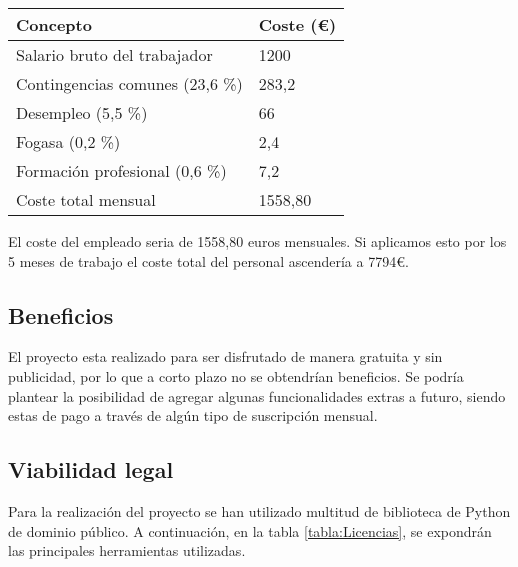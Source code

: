 \begin{table}[H]
	\begin{center}
		\begin{tabular}{ll}
			\hline
			Concepto                        & Coste (€) \\ \hline
			Salario bruto del trabajador    & 1200      \\
			Contingencias comunes (23,6 \%) & 283,2     \\
			Desempleo (5,5 \%)              & 66        \\
			Fogasa (0,2 \%)                 & 2,4       \\
			Formación profesional (0,6 \%)  & 7,2       \\ \hline
			Coste total mensual             & 1558,80  
		\end{tabular}
	\end{center}
\end{table}


El coste del empleado seria de 1558,80 euros mensuales. Si aplicamos esto por los 5 meses de trabajo el coste total del personal ascendería a 7794€.

\subsection{Beneficios}
El proyecto esta realizado para ser disfrutado de manera gratuita y sin publicidad, por lo que a corto plazo no se obtendrían beneficios. Se podría plantear la posibilidad de agregar algunas funcionalidades extras a futuro, siendo estas de pago a través de algún tipo de suscripción mensual.

\subsection{Viabilidad legal}

Para la realización del proyecto se han utilizado multitud de biblioteca de Python de dominio público. A continuación, en la tabla \ref{tabla:Licencias}, se expondrán las principales herramientas utilizadas.


